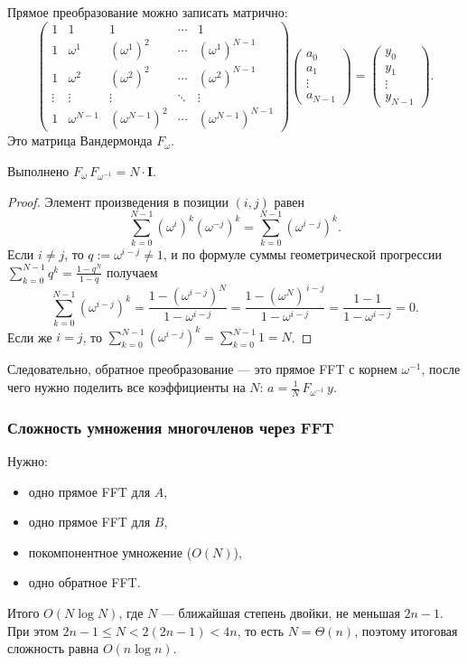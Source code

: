 Прямое преобразование можно записать матрично:
\[
\begin{pmatrix}
	1 & 1 & 1 & \cdots & 1 \\
	1 & \omega^1 & (\omega^1)^2 & \cdots & (\omega^1)^{N-1} \\
	1 & \omega^2 & (\omega^2)^2 & \cdots & (\omega^2)^{N-1} \\
	\vdots & \vdots & \vdots & \ddots & \vdots \\
	1 & \omega^{N-1} & (\omega^{N-1})^2 & \cdots & (\omega^{N-1})^{N-1}
\end{pmatrix}
\begin{pmatrix}
	a_0\\ a_1\\ \vdots\\ a_{N-1}
\end{pmatrix}
=
\begin{pmatrix}
	y_0\\ y_1\\ \vdots\\ y_{N-1}
\end{pmatrix}.
\]
Это матрица Вандермонда $F_\omega$.

\begin{Statement}{}{}
	Выполнено $F_\omega \,F_{\omega^{-1}} = N\cdot \mathbf{I}$.
\end{Statement}

\begin{proof}
	Элемент произведения в позиции $(i,j)$ равен
	\[
	\sum_{k=0}^{N-1}(\omega^i)^k(\omega^{-j})^k
	=\sum_{k=0}^{N-1}(\omega^{i-j})^k.
	\]
	Если $i\neq j$, то $q:=\omega^{i-j}\neq 1$, и по формуле суммы геометрической прогрессии $\sum_{k=0}^{N-1} q^k=\frac{1-q^N}{1-q}$
	получаем
	\[
	\sum_{k=0}^{N-1}(\omega^{i-j})^k
	=\frac{1-(\omega^{i-j})^N}{1-\omega^{i-j}}
	=\frac{1-(\omega^N)^{\,i-j}}{1-\omega^{i-j}}
	=\frac{1-1}{1-\omega^{i-j}}=0.
	\]
	Если же $i=j$, то $\sum_{k=0}^{N-1}(\omega^{i-j})^k=\sum_{k=0}^{N-1}1=N$.
\end{proof}

Следовательно, обратное преобразование — это прямое FFT с корнем $\omega^{-1}$,
после чего нужно поделить все коэффициенты на $N$: $a = \frac{1}{N}\,F_{\omega^{-1}}\,y$.

\subsubsection*{Сложность умножения многочленов через FFT}

Нужно:
\begin{itemize}
	\item одно прямое FFT для $A$,
	\item одно прямое FFT для $B$,
	\item покомпонентное умножение ($O(N)$),
	\item одно обратное FFT.
\end{itemize}
Итого $O(N\log N)$, где $N$ — ближайшая степень двойки, не меньшая $2n-1$.
При этом $2n-1 \le N < 2(2n-1) < 4n$, то есть $N=\Theta(n)$, поэтому итоговая сложность равна $O(n\log n)$.

